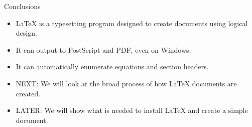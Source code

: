 \documentclass[pdf]{prosper}
\begin{document}
\begin{slide}{Conclusions}
	\begin{itemize}
		\item \LaTeX\mbox{} is a typesetting program designed to create documents using logical design.
		\item It can output to PostScript and PDF, even on Windows.
		\item It can automatically enumerate equations and section headers.
		\item NEXT: We will look at the broad process of how \LaTeX\mbox{} documents are created.
		\item LATER: We will show what is needed to install \LaTeX\mbox{} and create a simple document.
	\end{itemize}
\end{slide}
\end{document}
